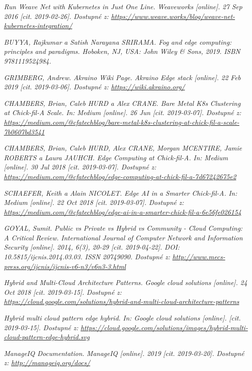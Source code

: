 \begin{thebibliography}{10}
	\emph{Run Weave Net with Kubernetes in Just One Line. Weaveworks [online]. 27 Sep 2016 [cit. 2019-02-26]. Dostupné z: \url{https://www.weave.works/blog/weave-net-kubernetes-integration/}}

	\emph{BUYYA, Rajkumar a Satish Narayana SRIRAMA. Fog and edge computing: principles and paradigms. Hoboken, NJ, USA: John Wiley & Sons, 2019. ISBN 9781119524984.}

	\emph{GRIMBERG, Andrew. Akraino Wiki Page. Akraino Edge stack [online]. 22 Feb 2019 [cit. 2019-03-06]. Dostupné z: \url{https://wiki.akraino.org/}}

	\emph{CHAMBERS, Brian, Caleb HURD a Alex CRANE. Bare Metal K8s Clustering at Chick-fil-A Scale. In: Medium [online]. 26 Jun [cit. 2019-03-07]. Dostupné z: \url{https://medium.com/@cfatechblog/bare-metal-k8s-clustering-at-chick-fil-a-scale-7b0607bd3541}}

	\emph{CHAMBERS, Brian, Caleb HURD, Alex CRANE, Morgan MCENTIRE, Jamie ROBERTS a Laura JAUHCH. Edge Computing at Chick-fil-A. In: Medium [online]. 30 Jul 2018 [cit. 2019-03-07]. Dostupné z: \url{https://medium.com/@cfatechblog/edge-computing-at-chick-fil-a-7d67242675e2}}

	\emph{SCHAEFER, Keith a Alain NICOLET. Edge AI in a Smarter Chick-fil-A. In: Medium [online]. 22 Oct 2018 [cit. 2019-03-07]. Dostupné z: \url{https://medium.com/@cfatechblog/edge-ai-in-a-smarter-chick-fil-a-6e56fe026154}}


	\emph{GOYAL, Sumit. Public vs Private vs Hybrid vs Community - Cloud Computing: A Critical Review. International Journal of Computer Network and Information Security [online]. 2014, 6(3), 20-29 [cit. 2019-04-22]. DOI: 10.5815/ijcnis.2014.03.03. ISSN 20749090. Dostupné z: \url{http://www.mecs-press.org/ijcnis/ijcnis-v6-n3/v6n3-3.html}}

	\emph{Hybrid and Multi-Cloud Architecture Patterns. Google cloud solutions [online]. 24 Oct 2018 [cit. 2019-03-15]. Dostupné z: \url{https://cloud.google.com/solutions/hybrid-and-multi-cloud-architecture-patterns}}

	\emph{Hybrid multi cloud pattern edge hybrid. In: Google cloud solutions [online]. [cit. 2019-03-15]. Dostupné z: \url{https://cloud.google.com/solutions/images/hybrid-multi-cloud-pattern-edge-hybrid.svg}}

	\emph{ManageIQ Documentation. ManageIQ [online]. 2019 [cit. 2019-03-20]. Dostupné z: \url{http://manageiq.org/docs/}}


\end{thebibliography}
